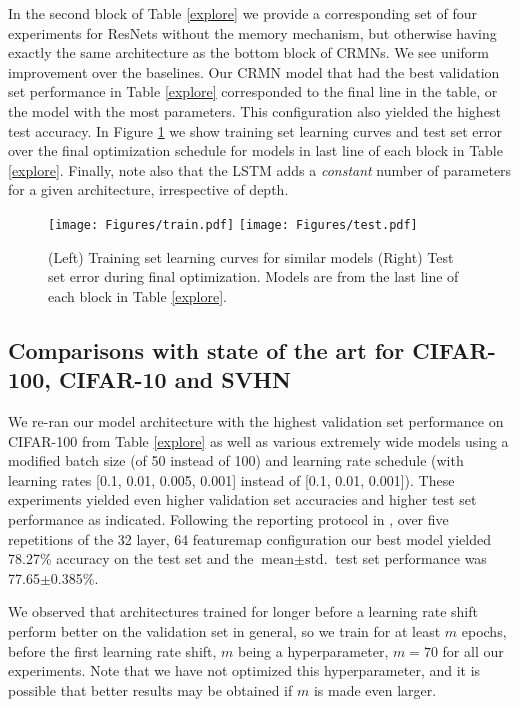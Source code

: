 \documentclass{article}
\begin{document}
In the second block of Table \ref{explore} we provide a corresponding set of four experiments for ResNets without the memory mechanism, but otherwise having exactly the same architecture as the bottom block of CRMNs. We see uniform improvement over the baselines.
Our CRMN model that had the best validation set performance in Table \ref{explore} corresponded to the final line in the table, or the model with the most parameters. This configuration also yielded the highest test accuracy.
In Figure \ref{fig:curves} we show training set learning curves and test set error over the final optimization schedule for models in last line of each block in Table \ref{explore}.
Finally, note also that the LSTM adds a \emph{constant} number of parameters for a given architecture, irrespective of depth.

\begin{figure}[htbp]
  \centering
    \texttt{[image: Figures/train.pdf]} \hspace{.2cm}
     \texttt{[image: Figures/test.pdf]}
  \caption[Learning Curves]{(Left) Training set learning curves for similar models (Right) Test set error during final optimization. Models are from the last line of each block in Table \ref{explore}.}
  \label{fig:curves}
\end{figure}

\subsection{Comparisons with state of the art for CIFAR-100, CIFAR-10 and SVHN}

We re-ran our model architecture with the highest validation set performance on CIFAR-100 from Table \ref{explore} as well as various extremely wide models %
using a modified batch size (of 50 instead of 100) and learning rate schedule (with learning rates [0.1, 0.01, 0.005, 0.001] instead of [0.1, 0.01, 0.001]). These experiments yielded even higher validation set accuracies and higher test set performance as indicated. Following the reporting protocol in \cite{he2015deep}, over five repetitions of the 32 layer, 64 featuremap configuration our best model yielded 78.27\% accuracy on the test set and the $\textrm{mean} \pm{\textrm{std.}}$ test set performance was 77.65$\pm${0.385}\%.

We observed that architectures trained for longer before a learning rate shift perform better on the validation set in general, so we train for at least $m$ epochs, before the first learning rate shift, $m$ being a hyperparameter, $m=70$ for all our experiments. Note that we have not optimized this hyperparameter, and it is possible that better results may be obtained if $m$ is made even larger.
\end{document}

